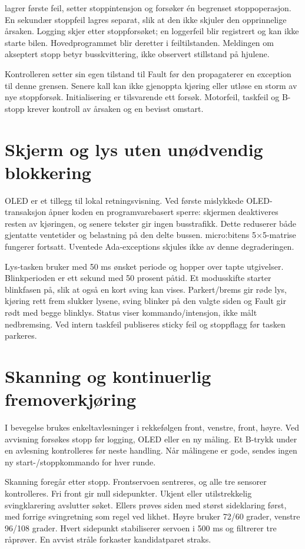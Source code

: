  lagrer første feil, setter stoppintensjon og
forsøker én begrenset stoppoperasjon. En sekundær stoppfeil lagres separat,
slik at den ikke skjuler den opprinnelige årsaken. Logging skjer etter
stoppforsøket; en loggerfeil blir registrert og kan ikke starte bilen.
Hovedprogrammet blir deretter i feiltilstanden. Meldingen om akseptert
stopp betyr busskvittering, ikke observert stillstand på hjulene.

Kontrolleren setter sin egen tilstand til Fault før den propagaterer en
exception til denne grensen. Senere kall kan ikke gjenoppta kjøring eller
utløse en storm av nye stoppforsøk. Initialisering er tilsvarende ett forsøk.
Motorfeil, taskfeil og B-stopp krever kontroll av årsaken og en bevisst omstart.

\section{Skjerm og lys uten unødvendig blokkering}
OLED er et tillegg til lokal retningsvisning. Ved første mislykkede
OLED-transaksjon åpner koden en programvarebasert sperre: skjermen
deaktiveres resten av kjøringen, og senere tekster gir ingen busstrafikk.
Dette reduserer både gjentatte ventetider og belastning på den delte bussen.
micro:bitens 5$\times$5-matrise fungerer fortsatt. Uventede Ada-exceptions
skjules ikke av denne degraderingen.

Lys-tasken bruker  med 50 ms ønsket periode og hopper
over tapte utgivelser. Blinkperioden er ett sekund med 50 prosent påtid.
Et modusskifte starter blinkfasen på, slik at også en kort sving kan vises.
Parkert/brems gir røde lys, kjøring rett frem slukker lysene, sving blinker
på den valgte siden og Fault gir rødt med begge blinklys. Status viser
kommando/intensjon, ikke målt nedbremsing. Ved intern taskfeil publiseres
sticky feil og stoppflagg før tasken parkeres.

\section{Skanning og kontinuerlig fremoverkjøring}
I bevegelse brukes enkeltavlesninger i rekkefølgen front, venstre, front,
høyre. Ved avvisning forsøkes stopp før logging, OLED eller en ny måling.
Et B-trykk under en avlesning kontrolleres før neste handling. Når målingene
er gode, sendes ingen ny start-/stoppkommando for hver runde.

Skanning foregår etter stopp. Frontservoen sentreres, og alle tre sensorer
kontrolleres. Fri front gir null sidepunkter. Ukjent eller utilstrekkelig
svingklarering avslutter søket. Ellers prøves siden med størst sideklaring
først, med forrige svingretning som regel ved likhet. Høyre bruker 72/60 grader,
venstre 96/108 grader. Hvert sidepunkt stabiliserer servoen i 500 ms og
filtrerer tre råprøver. En avvist stråle forkaster kandidatparet straks.

